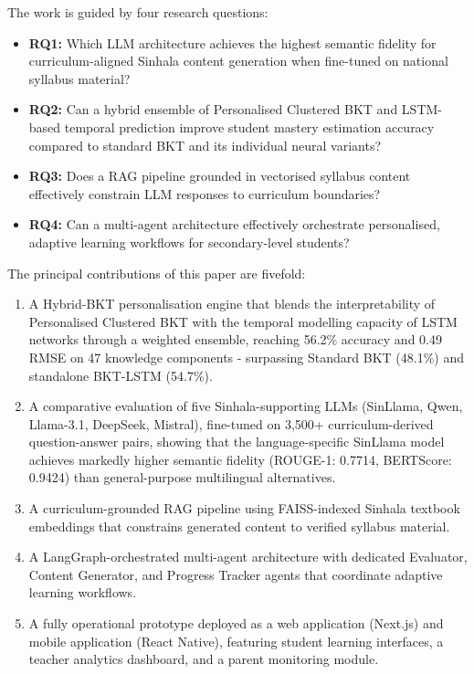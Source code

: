 \documentclass[conference]{IEEEtran}
\begin{document}
The work is guided by four research questions:

\begin{itemize}
\item \textbf{RQ1:} Which LLM architecture achieves the highest semantic fidelity for curriculum-aligned Sinhala content generation when fine-tuned on national syllabus material?
\item \textbf{RQ2:} Can a hybrid ensemble of Personalised Clustered BKT and LSTM-based temporal prediction improve student mastery estimation accuracy compared to standard BKT and its individual neural variants?
\item \textbf{RQ3:} Does a RAG pipeline grounded in vectorised syllabus content effectively constrain LLM responses to curriculum boundaries?
\item \textbf{RQ4:} Can a multi-agent architecture effectively orchestrate personalised, adaptive learning workflows for secondary-level students?
\end{itemize}

The principal contributions of this paper are fivefold:

\begin{enumerate}
\item A Hybrid-BKT personalisation engine that blends the interpretability of Personalised Clustered BKT with the temporal modelling capacity of LSTM networks through a weighted ensemble, reaching 56.2\% accuracy and 0.49 RMSE on 47 knowledge components - surpassing Standard BKT (48.1\%) and standalone BKT-LSTM (54.7\%).

\item A comparative evaluation of five Sinhala-supporting LLMs (SinLlama, Qwen, Llama-3.1, DeepSeek, Mistral), fine-tuned on 3,500+ curriculum-derived question-answer pairs, showing that the language-specific SinLlama model achieves markedly higher semantic fidelity (ROUGE-1: 0.7714, BERTScore: 0.9424) than general-purpose multilingual alternatives.

\item A curriculum-grounded RAG pipeline using FAISS-indexed Sinhala textbook embeddings that constrains generated content to verified syllabus material.

\item A LangGraph-orchestrated multi-agent architecture with dedicated Evaluator, Content Generator, and Progress Tracker agents that coordinate adaptive learning workflows.

\item A fully operational prototype deployed as a web application (Next.js) and mobile application (React Native), featuring student learning interfaces, a teacher analytics dashboard, and a parent monitoring module.
\end{enumerate}
\end{document}
